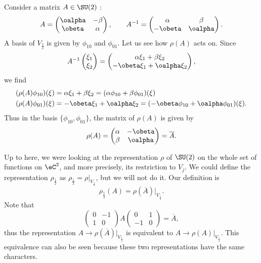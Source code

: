 Consider a matrix $A\in\SU(2)$ : 
\begin{equation}
A=\begin{pmatrix}
\oalpha & -\beta \\ 
\obeta & \alpha
\end{pmatrix},\qquad
A^{-1}=\begin{pmatrix}
\alpha & \beta \\ 
-\obeta & \oalpha
\end{pmatrix}.
\end{equation}
A basis of $V_{\frac{1}{2}}$ is given by $\phi_{10}$ and $\phi_{01}$. Let us see how $\rho(A)$ acts on. Since
\[
A^{-1}\begin{pmatrix}
\xi_1 \\ 
\xi_2
\end{pmatrix}=
\begin{pmatrix}
\alpha\xi_1+\beta\xi_2 \\ 
-\obeta\xi_1+\oalpha\xi_2
\end{pmatrix},
\]
we find
\begin{equation}
\begin{split}
  (\rho(A)\phi_{10})(\xi)&=\alpha\xi_1+\beta\xi_2=(\alpha\phi_{10}+\beta\phi_{01})(\xi)\\
  (\rho(A)\phi_{01})(\xi)&=-\obeta\xi_1+\oalpha\xi_2=(-\obeta\phi_{10}+\oalpha\phi_{01})(\xi).
\end{split}
\end{equation}
Thus in the basis $\{\phi_{10},\phi_{01}\}$, the matrix of $\rho(A)$ is given by
\begin{equation}
\rho(A)=\begin{pmatrix}
\alpha & -\obeta \\ 
\beta & \oalpha
\end{pmatrix}=\overline{A}.
\end{equation}

Up to here, we were looking at the representation $\rho$ of $\SU(2)$ on the whole set of functions on $\eC^2$, and more precisely, its restriction to $V_j$. We could define the representation $\rho_{\frac{1}{2}}$ as $\rho_{\frac{1}{2}}=\rho|_{V_{\frac{1}{2}}}$, but we will not do it. Our definition is
\begin{equation}
  \rho_{\frac{1}{2}}(A)=\rho(\overline{A})|_{V_{\frac{1}{2}}}.
\end{equation}
Note that 
\[
\begin{pmatrix}
0 & -1 \\ 
1 & 0
\end{pmatrix}
A 
\begin{pmatrix}
0 & 1 \\ 
-1 & 0
\end{pmatrix}=\overline{A},
\]
thus the representation $A\to\rho(\overline{A})|_{V_{\frac{1}{2}}}$ is equivalent to $A\to\rho(A)|_{V_{\frac{1}{2}}}$. This equivalence can also be seen because these two representations have the same characters\quextproj.

